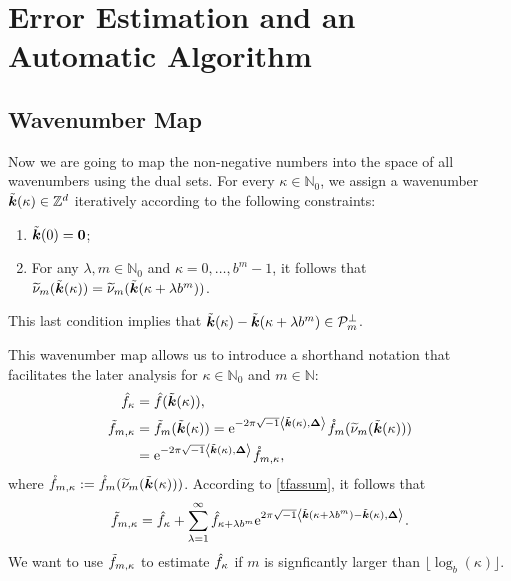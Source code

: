 \documentclass[graybox,footinfo]{svmult}
\newcommand{\Z}{\mathbb{Z}} %
\newcommand{\N}{\mathbb{N}} %
\newcommand{\bszero}{\boldsymbol{0}} %
\newcommand{\bsDelta}{\boldsymbol{\Delta}}    %
\begin{document}
\section{Error Estimation and an Automatic Algorithm}

\subsection{Wavenumber Map}

Now we are going to map the non-negative numbers into the space of all wavenumbers using the dual sets.  For every $\kappa \in \N_0$, we assign a wavenumber $\tvk(\kappa) \in \Z^d$ iteratively according to the following constraints:
\begin{enumerate}
\renewcommand{\labelenumi}{\roman{enumi})}

\item $\tvk(0)= \bszero$;

\item For any $\lambda, m \in \N_0$ and $\kappa=0, \ldots, b^m-1$, it follows that  $\widetilde{\nu}_m(\tilde{\boldsymbol{k}}(\kappa))=\widetilde{\nu}_m(\tilde{\boldsymbol{k}}(\kappa+\lambda b^m))$.

\end{enumerate}
This last condition implies that $\tilde{\boldsymbol{k}}(\kappa) - \tilde{\boldsymbol{k}}(\kappa+\lambda b^m) \in \mathcal{P}_m^{\perp}$.

This wavenumber map allows us to introduce a shorthand notation that facilitates the later analysis for $\kappa \in \N_0$ and $m \in \N$:
\begin{align*}
\hf_{\kappa} & =\hf(\tvk(\kappa)), \\
\tf_{m,\kappa}& = \tf_m(\tvk(\kappa))= \me^{-2 \pi \sqrt{-1} \ip{\tvk(\kappa)}{\bsDelta}} \rf_m(\tnu_m(\tvk(\kappa)))\\
&= \me^{-2 \pi \sqrt{-1} \ip{\tvk(\kappa)}{\bsDelta}} \rf_{m,\kappa},
\end{align*}
where $\mathring{f}_{m,\kappa}:=\mathring{f}_m(\widetilde{\nu}_m(\tilde{\boldsymbol{k}}(\kappa)))$. According to \eqref{tfassum}, it follows that
\begin{equation}
\tf_{m,\kappa} = \hf_{\kappa} + \sum_{\lambda=1}^{\infty} \hf_{\kappa+\lambda b^{m}} \me^{2 \pi \sqrt{-1} \ip{\tvk(\kappa+\lambda b^{m}) - \tvk(\kappa)}{\bsDelta}}.
\label{tfassumc}
\end{equation}
We want to use $\tilde{f}_{m,\kappa}$ to estimate $\hat{f}_{\kappa}$ if $m$ is signficantly larger than $\lfloor \log_b(\kappa) \rfloor$.
\end{document}
